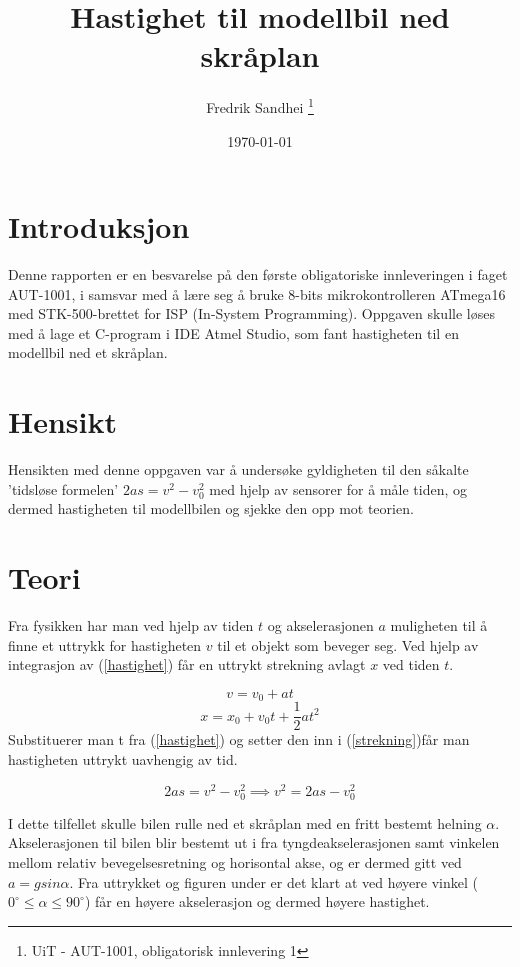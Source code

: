 \documentclass[11pt, a4paper]{report}
\begin{document}
\title{Hastighet til modellbil ned skråplan}
\author{Fredrik Sandhei \thanks{UiT - AUT-1001, obligatorisk innlevering 1}}
\date{\today}
\maketitle
\newpage
\tableofcontents
\newpage

\section{Introduksjon}
Denne rapporten er en besvarelse på den første obligatoriske innleveringen i faget AUT-1001, i samsvar med å lære seg å bruke 8-bits mikrokontrolleren ATmega16 med STK-500-brettet for ISP (In-System Programming). Oppgaven skulle løses med å lage et C-program i IDE Atmel Studio, som fant hastigheten til en modellbil ned et skråplan. 

\section{Hensikt}
Hensikten med denne oppgaven var å undersøke gyldigheten til den såkalte 'tidsløse formelen' $ 2as = v^{2} - v_{0}^{2} $ med hjelp av sensorer for å måle tiden, og dermed hastigheten til modellbilen og sjekke den opp mot teorien.

\section{Teori}
Fra fysikken har man ved hjelp av tiden $t$ og akselerasjonen $a$ muligheten til å finne et uttrykk for hastigheten $v$ til et objekt som beveger seg. Ved hjelp av integrasjon av (\ref{hastighet}) får en uttrykt strekning avlagt $x$ ved tiden $t$.

\begin{equation} \label{hastighet}
v = v_{0} + at
\end{equation}
\begin{equation} \label{strekning}
x = x_{0} + v_{0}t + \frac{1}{2}at^{2}
\end{equation}
Substituerer man t fra (\ref{hastighet}) og setter den inn i (\ref{strekning})får man hastigheten uttrykt uavhengig av tid.

\begin{equation}
2as = v^{2}-v_{0}^{2} \implies v^{2} = 2as-v_{0}^{2}
\end{equation}
\newline

I dette tilfellet skulle bilen rulle ned et skråplan med en fritt bestemt helning $\alpha$. Akselerasjonen til bilen blir bestemt ut i fra tyngdeakselerasjonen samt vinkelen mellom relativ bevegelsesretning og horisontal akse, og er dermed gitt ved $a = gsin \alpha$. Fra uttrykket og figuren under er det klart at ved høyere vinkel ($0^\circ \leq\alpha\leq 90^\circ$) får en høyere akselerasjon og dermed høyere hastighet.\newline
\end{document}
